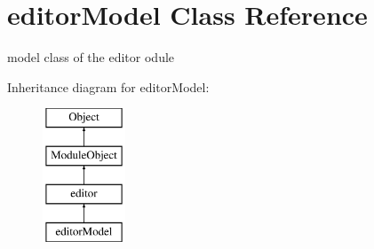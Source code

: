 \hypertarget{classeditorModel}{\section{editor\-Model Class Reference}
\label{classeditorModel}
}


model class of the editor odule  


Inheritance diagram for editor\-Model\-:\begin{figure}[H]
\begin{center}
\leavevmode
\includegraphics[height=4.000000cm]{classeditorModel}
\end{center}
\end{figure}
